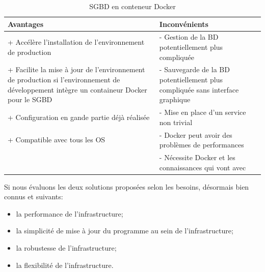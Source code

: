 \documentclass[
    iai, %
    il, %
]{heig-tb}
\begin{document}
\begin{table}[h]
    \begin{center}
        \caption{SGBD en conteneur Docker \label{prod-db-docker}}
        \begin{tabularx}{1.0\textwidth} {X|X}
            Avantages                                                  & Inconvénients                                                          \\ \hline
            + Accélère l'installation de l'environnement de production & - Gestion de la BD
            potentiellement plus compliquée                                                                                                     \\
            + Facilite la mise à jour de l'environnement de production si l'environnement de
            développement intègre un containeur Docker pour le SGBD    & - Sauvegarde de la BD
            potentiellement plus compliquée sans interface graphique                                                                            \\
            + Configuration en gande partie déjà réalisée              & - Mise en place d'un service non trivial                               \\
            + Compatible avec tous les OS                              & - Docker peut avoir des problèmes de performances
            \cite{labrecque}                                                                                                                    \\
                                                                       & - Nécessite Docker et les connaissances qui vont avec \cite{labrecque} \\
        \end{tabularx}
    \end{center}
\end{table}

Si nous évaluons les deux solutions proposées selon les besoins, désormais bien connus et suivants:
\begin{itemize}
    \item la performance de l'infrastructure;
    \item la simplicité de mise à jour du programme au sein de l'infrastructure;
    \item la robustesse de l'infrastructure;
    \item la flexibilité de l'infrastructure.
\end{itemize}
\end{document}
